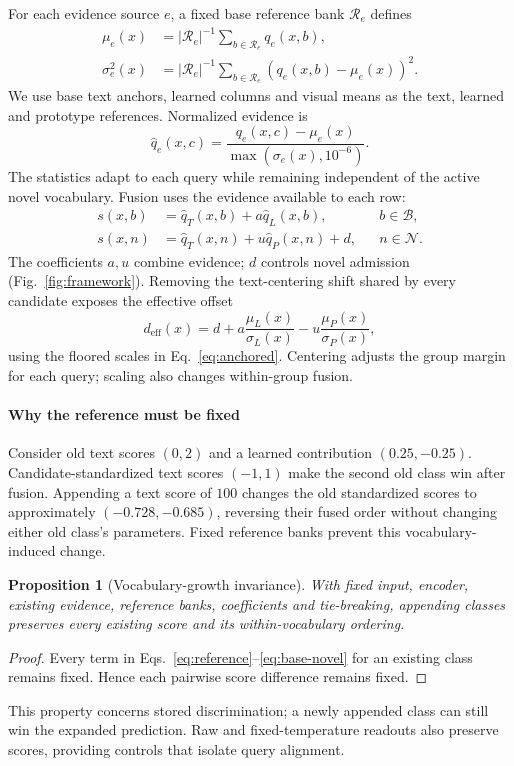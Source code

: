 \documentclass[preprint,review,12pt]{elsarticle}
\newtheorem{proposition}{Proposition}
\begin{document}
For each evidence source $e$, a fixed base reference bank $\mathcal R_e$ defines
\begin{align}
 \mu_e(x)&=|\mathcal R_e|^{-1}\sum_{b\in\mathcal R_e}q_e(x,b),\\
 \sigma_e^2(x)&=|\mathcal R_e|^{-1}\sum_{b\in\mathcal R_e}(q_e(x,b)-\mu_e(x))^2.
 \label{eq:reference}
\end{align}
We use base text anchors, learned columns and visual means as the text, learned and prototype references. Normalized evidence is
\begin{equation}
 \widehat q_e(x,c)=\frac{q_e(x,c)-\mu_e(x)}{\max(\sigma_e(x),10^{-6})}.
 \label{eq:anchored}
\end{equation}
The statistics adapt to each query while remaining independent of the active novel vocabulary. Fusion uses the evidence available to each row:
\begin{align}
 s(x,b)&=\widehat q_T(x,b)+a\widehat q_L(x,b),&&b\in\mathcal B,\\
 s(x,n)&=\widehat q_T(x,n)+u\widehat q_P(x,n)+d,&&n\in\mathcal N.
 \label{eq:base-novel}
\end{align}
The coefficients $a,u$ combine evidence; $d$ controls novel admission (Fig.~\ref{fig:framework}). Removing the text-centering shift shared by every candidate exposes the effective offset
\begin{equation}
 d_{\mathrm{eff}}(x)=d+a\frac{\mu_L(x)}{\sigma_L(x)}-u\frac{\mu_P(x)}{\sigma_P(x)},
 \label{eq:effectiveadmission}
\end{equation}
using the floored scales in Eq.~\eqref{eq:anchored}. Centering adjusts the group margin for each query; scaling also changes within-group fusion.

\paragraph{Why the reference must be fixed}
Consider old text scores $(0,2)$ and a learned contribution $(0.25,-0.25)$. Candidate-standardized text scores $(-1,1)$ make the second old class win after fusion. Appending a text score of $100$ changes the old standardized scores to approximately $(-0.728,-0.685)$, reversing their fused order without changing either old class's parameters. Fixed reference banks prevent this vocabulary-induced change.

\begin{proposition}[Vocabulary-growth invariance]
With fixed input, encoder, existing evidence, reference banks, coefficients and tie-breaking, appending classes preserves every existing score and its within-vocabulary ordering.
\label{prop:invariance}
\end{proposition}
\begin{proof}
Every term in Eqs.~\eqref{eq:reference}--\eqref{eq:base-novel} for an existing class remains fixed. Hence each pairwise score difference remains fixed.
\end{proof}
This property concerns stored discrimination; a newly appended class can still win the expanded prediction. Raw and fixed-temperature readouts also preserve scores, providing controls that isolate query alignment.
\end{document}
